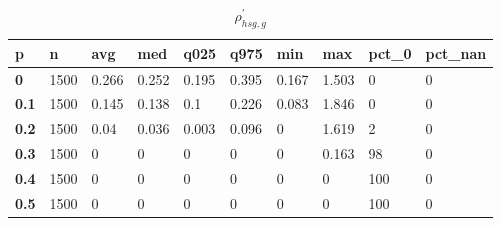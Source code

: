 \begin{table}[h]
 \centering 
\footnotesize
\caption{$\rho_{hsg,g}^\prime $}
\label{tab:alphahsgg}
\begin{tabular}[h]{|l|l|l|l|l|l|l|l|l|l|
    } \hline
\textbf{ p} & \textbf{ n} & \textbf{ avg} & \textbf{ med} & \textbf{ q025} & \textbf{ q975} & \textbf{ min} & \textbf{ max} & \textbf{ pct\_0} & \textbf{ pct\_nan}
    \\ \hline
  \textbf{  0} & 1500 & 0.266 & 0.252 & 0.195 & 0.395 & 0.167 & 1.503 &   0 & 0
    \\ \hline
  \textbf{0.1} & 1500 & 0.145 & 0.138 &   0.1 & 0.226 & 0.083 & 1.846 &   0 & 0
    \\ \hline
  \textbf{0.2} & 1500 &  0.04 & 0.036 & 0.003 & 0.096 &     0 & 1.619 &   2 & 0
    \\ \hline
  \textbf{0.3} & 1500 &     0 &     0 &     0 &     0 &     0 & 0.163 &  98 & 0
    \\ \hline
  \textbf{0.4} & 1500 &     0 &     0 &     0 &     0 &     0 &     0 & 100 & 0
    \\ \hline
  \textbf{0.5} & 1500 &     0 &     0 &     0 &     0 &     0 &     0 & 100 & 0
    \\ \hline
 \end{tabular}
 \end{table}
